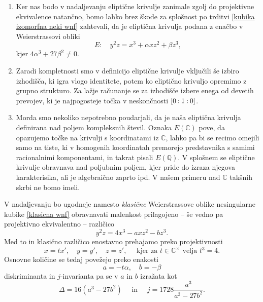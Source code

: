 \documentclass[mat1]{fmfdelo}
\newcommand{\C}{\mathbb C}
\newcommand{\CM}{\mathbb C ^\times}
\newcommand{\Q}{\mathbb Q}
\newcommand{\pcoor}[1]{%
  \begingroup\lccode`~=`: \lowercase{\endgroup
  \edef~}{\mathbin{\mathchar\the\mathcode`:}\nobreak}%
  [%
  \begingroup
  \mathcode`:=\string"8000
  #1%
  \endgroup
  ]%
}
\theoremstyle{definition}
\begin{document}
\begin{opomba}
    \begin{enumerate}
        \item
        Ker nas bodo v nadaljevanju eliptične krivulje zanimale zgolj do projektivne ekvivalence natančno, bomo lahko brez škode za splošnost po trditvi \ref{kubika izomorfna neki wnf} zahtevali, da je eliptična krivulja podana z enačbo v Weierstrassovi obliki
        \[
            E: \quad y^2z = x^3 + \alpha x z^2 + \beta z^3,  
        \]  
        kjer $4\alpha^3 + 27\beta^2 \neq 0$. 
        \item 
        Zaradi kompletnosti smo v definicijo eliptične krivulje vključili še izbiro izhodišča, ki igra vlogo identitete, potem ko eliptično krivuljo opremimo z grupno strukturo. Za lažje računanje se za izhodišče izbere enega od devetih prevojev, ki je najpogosteje točka v neskončnosti $\pcoor{0:1:0}$.  
        \item 
        Morda smo nekoliko nepotrebno poudarjali, da je naša eliptična krivulja definirana nad poljem kompleksnih števil. Oznaka $E(\C)$ pove, da opazujemo točke na krivulji s koordinatami iz $\C$, lahko pa bi se recimo omejili samo na tiste, ki v homogenih koordinatah premorejo predstavnika s samimi racionalnimi komponentami, in takrat pisali $E(\Q)$. V splošnem se eliptične krivulje obravnava nad poljubnim poljem, kjer pride do izraza njegova karakterisika, ali je algebraično zaprto ipd. V našem primeru nad $\C$ takšnih skrbi ne bomo imeli. 
    \end{enumerate}
\end{opomba}

V nadaljevanju bo ugodneje namesto \emph{klasične} Weierstrassove oblike nesingularne kubike \ref{klasicna wnf} obravnavati malenkost prilagojeno -- še vedno pa projektivno ekvivalentno -- različico
\[
    y^2z = 4x^3 - axz^2 - bz^3.  
\]
Med to in klasično različico enostavno prehajamo preko projektivnosti
\[
    x = tx', \quad y = y', \quad z = z', \quad \text{ kjer za } t \in \CM \text{ velja } t^3 = 4.   
\]
Osnovne količine se tedaj povežejo preko enakosti
\[
    a = -t\alpha, \quad b = -\beta    
\]
diskriminanta in $j$-invarianta pa se v $a$ in $b$ izražata kot
\begin{equation}
    \label{transformacija diskriminante in j-invariante}    
    \Delta = 16(a^3 - 27b^2) \quad \text{ in } \quad j = 1728\frac{a^3}{a^3 - 27b^2}.
\end{equation}


\end{document}
